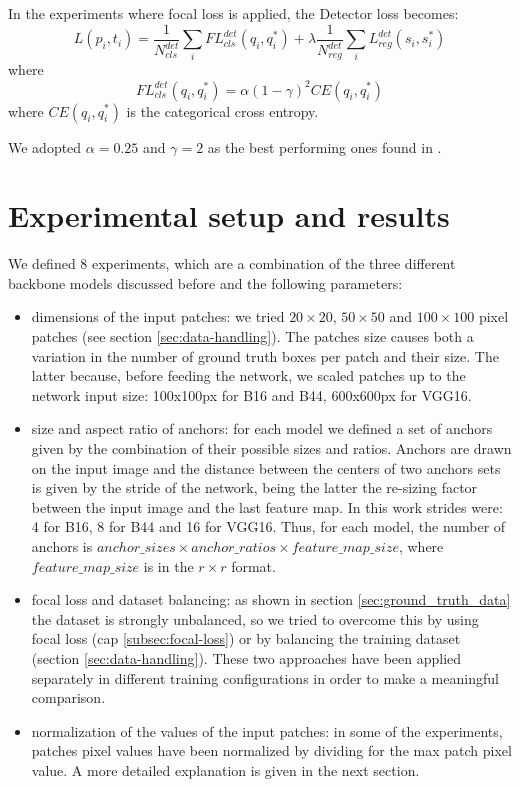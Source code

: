 \documentclass[a4paper,10pt]{report}
\begin{document}
In the experiments where focal loss is applied, the Detector loss becomes:
\[L({p_i}, {t_i}) = \dfrac{1}{N_{cls}^{det}} \sum_{i} FL_{cls}^{det}(q_i, q_i^*) + \lambda \dfrac{1}{N_{reg}^{det}} \sum_{i}L_{reg}^{det}(s_i, s_i^*) \]
where
\[FL_{cls}^{det}(q_i, q_i^*) = \alpha (1-\gamma)^2 CE(q_i, q_i^*)\]
where $CE(q_i, q_i^*)$ is the categorical cross entropy. 

We adopted $\alpha=0.25$ and $\gamma=2$ as the best performing ones found in \cite{focal-loss}.

\chapter{Experimental setup and results}\label{chap:experiments}
 We defined 8 experiments, which are a combination of the three different backbone models discussed before and the following parameters:

\begin{itemize}
    \item dimensions of the input patches: we tried $20 \times 20$, $50 \times 50$ and $100 \times 100$ pixel patches (see section \ref{sec:data-handling}). The patches size causes both a variation in the number of ground truth boxes per patch and their size. The latter because, before feeding the network, we scaled patches up to the network input size: 100x100px for B16 and B44, 600x600px for VGG16.
    \item size and aspect ratio of anchors: for each model we defined a set of anchors given by the combination of their possible sizes and ratios. Anchors are drawn on the input image and the distance between the centers of two anchors sets is given by the stride of the network, being the latter the re-sizing factor between the input image and the last feature map. In this work strides were: 4 for B16, 8 for B44 and 16 for VGG16. Thus, for each model, the number of anchors is $anchor\_sizes \times anchor\_ratios \times feature\_map\_size$, where $feature\_map\_size$ is in the $r \times r$ format.
    \item focal loss and dataset balancing: as shown in section \ref{sec:ground_truth_data} the dataset is strongly unbalanced, so we tried to overcome this by using focal loss (cap \ref{subsec:focal-loss}) or by balancing the training dataset (section \ref{sec:data-handling}). These two approaches have been applied separately in different training configurations in order to make a meaningful comparison.  
    \item normalization of the values of the input patches: in some of the experiments, patches pixel values have been normalized by dividing for the max patch pixel value. A more detailed explanation is given in the next section.
\end{itemize}
\end{document}

